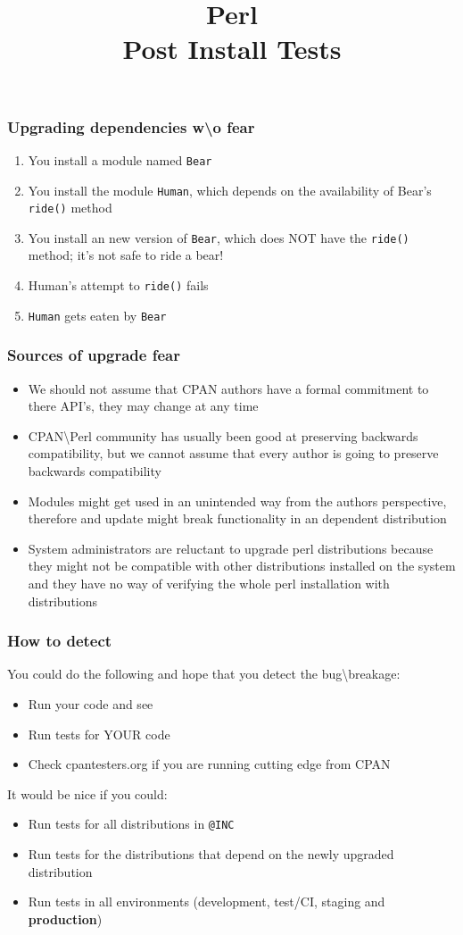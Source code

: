 \documentclass[10pt]{beamer}
\title{Perl \\ Post Install Tests}
\begin{document}
\begin{frame}
\titlepage
\end{frame}


\begin{frame}[fragile]
\frametitle{Upgrading dependencies w\textbackslash o fear}
\begin{enumerate}
  \item You install a module named \verb|Bear|
  \item You install the module \verb|Human|, which depends on the availability of Bear's \verb|ride()| method
  \item You install an new version of \verb|Bear|, which does NOT have the \verb|ride()| method; it's not safe to ride a bear!
  \item Human's attempt to \verb|ride()| fails
  \item \verb|Human| gets eaten by \verb|Bear|
\end{enumerate}
\end{frame}

\begin{frame}
\frametitle{Sources of upgrade fear}
\begin{itemize}
\item We should not assume that CPAN authors have a formal commitment to there API's, they may change at any time
\item CPAN\textbackslash Perl community has usually been good at preserving backwards compatibility, but we cannot assume that every author is going to preserve backwards compatibility
\item Modules might get used in an unintended way from the authors perspective, therefore and update might break functionality in an dependent distribution
\item System administrators are reluctant to upgrade perl distributions because they might not be compatible with other distributions installed on the system and they have no way of verifying the whole perl installation with distributions
\end{itemize}
\end{frame}

\begin{frame}[fragile]
\frametitle{How to detect}
You could do the following and hope that you detect the bug\textbackslash breakage:
\begin{itemize}
\item Run your code and see
\item Run tests for YOUR code
\item Check cpantesters.org if you are running cutting edge from CPAN
\end{itemize}
\vspace{5 mm}
It would be nice if you could:
\begin{itemize}
\item Run tests for all distributions in \verb|@INC|
\item Run tests for the distributions that depend on the newly upgraded distribution
\item Run tests in all environments (development, test/CI, staging and {\bf production})
\end{itemize}
\end{frame}
\end{document}
